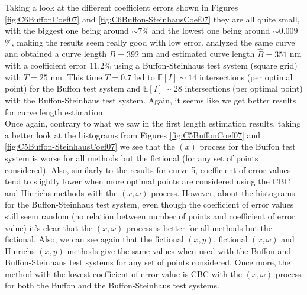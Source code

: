 

Taking a look at the different coefficient errors shown in Figures \ref{fig:C6BuffonCoef07} and \ref{fig:C6Buffon-SteinhausCoef07} they are all quite small, with the biggest one being around $\sim 7$\% and the lowest one being around $\sim 0.009$\%, making the results seem really good with low error. \cite{adn.pdf} analyzed the same curve and obtained a curve length $B=392$ nm and estimated curve length $\widehat{B}=351$ nm with a coefficient error $11.2$\% using a Buffon-Steinhaus test system (square grid) with $T=25$ nm. This time $T=0.7$ led to $\mathbb{E}[I] \sim 14$ intersections (per optimal point) for the Buffon test system and $\mathbb{E}[I] \sim 28$ intersections (per optimal point) with the Buffon-Steinhaus test system. Again, it seems like we get better results for curve length estimation.\\



Once again, contrary to what we saw in the first length estimation results, taking a better look at the histograms from Figures \ref{fig:C5BuffonCoef07} and \ref{fig:C5Buffon-SteinhausCoef07} we see that the $(x)$ process for the Buffon test system is worse for all methods but the fictional (for any set of points considered). Also, similarly to the results for curve 5, coefficient of error values tend to slightly lower when more optimal points are considered using the CBC and Hinrichs methods with the $(x,\omega)$ process. However, about the histograms for the Buffon-Steinhaus test system, even though the coefficient of error values still seem random (no relation between number of points and coefficient of error value) it's clear that the $(x,\omega)$ process is better for all methods but the fictional. Also, we can see again that the fictional $(x,y)$, fictional $(x,\omega)$ and Hinrichs $(x,y)$ methods give the same values when used with the Buffon and Buffon-Steinhaus test systems for any set of points considered. Once more, the method with the lowest coefficient of error value is CBC with the $(x,\omega)$ process for both the Buffon and the Buffon-Steinhaus test systems.\\






